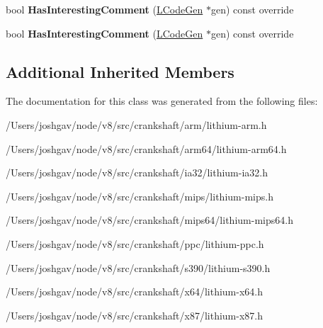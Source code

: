 \begin{DoxyCompactItemize}
\item 
bool {\bfseries Has\+Interesting\+Comment} (\hyperlink{classv8_1_1internal_1_1_l_code_gen}{L\+Code\+Gen} $\ast$gen) const  override\hypertarget{classv8_1_1internal_1_1_l_parameter_a8de03f60e00c9474dcde294fcd58f6ba}{}\label{classv8_1_1internal_1_1_l_parameter_a8de03f60e00c9474dcde294fcd58f6ba}

\item 
bool {\bfseries Has\+Interesting\+Comment} (\hyperlink{classv8_1_1internal_1_1_l_code_gen}{L\+Code\+Gen} $\ast$gen) const  override\hypertarget{classv8_1_1internal_1_1_l_parameter_a8de03f60e00c9474dcde294fcd58f6ba}{}\label{classv8_1_1internal_1_1_l_parameter_a8de03f60e00c9474dcde294fcd58f6ba}

\end{DoxyCompactItemize}
\subsection*{Additional Inherited Members}


The documentation for this class was generated from the following files\+:\begin{DoxyCompactItemize}
\item 
/\+Users/joshgav/node/v8/src/crankshaft/arm/lithium-\/arm.\+h\item 
/\+Users/joshgav/node/v8/src/crankshaft/arm64/lithium-\/arm64.\+h\item 
/\+Users/joshgav/node/v8/src/crankshaft/ia32/lithium-\/ia32.\+h\item 
/\+Users/joshgav/node/v8/src/crankshaft/mips/lithium-\/mips.\+h\item 
/\+Users/joshgav/node/v8/src/crankshaft/mips64/lithium-\/mips64.\+h\item 
/\+Users/joshgav/node/v8/src/crankshaft/ppc/lithium-\/ppc.\+h\item 
/\+Users/joshgav/node/v8/src/crankshaft/s390/lithium-\/s390.\+h\item 
/\+Users/joshgav/node/v8/src/crankshaft/x64/lithium-\/x64.\+h\item 
/\+Users/joshgav/node/v8/src/crankshaft/x87/lithium-\/x87.\+h\end{DoxyCompactItemize}
